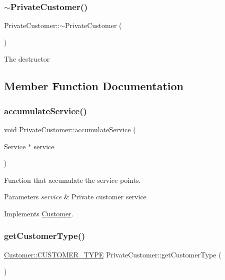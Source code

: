 \subsubsection{\texorpdfstring{$\sim$\+Private\+Customer()}{~PrivateCustomer()}}
{\footnotesize\ttfamily Private\+Customer\+::$\sim$\+Private\+Customer (\begin{DoxyParamCaption}{ }\end{DoxyParamCaption})}

The destructor 

\subsection{Member Function Documentation}
\hypertarget{classPrivateCustomer_a22e7d589398c26ac37973660f6e6f338}{}\label{classPrivateCustomer_a22e7d589398c26ac37973660f6e6f338} 
\subsubsection{\texorpdfstring{accumulate\+Service()}{accumulateService()}}
{\footnotesize\ttfamily void Private\+Customer\+::accumulate\+Service (\begin{DoxyParamCaption}\item[{\hyperlink{classService}{Service} $\ast$}]{service }\end{DoxyParamCaption})\hspace{0.3cm}{\ttfamily [virtual]}}

Function that accumulate the service points. 
\begin{DoxyParams}{Parameters}
{\em service} & Private customer service \\
\hline
\end{DoxyParams}


Implements \hyperlink{classCustomer_ab42320f3e4d1c23e745ce901d30faf77}{Customer}.

\hypertarget{classPrivateCustomer_a07d4d3e5995758b2407b8a81e35e579a}{}\label{classPrivateCustomer_a07d4d3e5995758b2407b8a81e35e579a} 
\subsubsection{\texorpdfstring{get\+Customer\+Type()}{getCustomerType()}}
{\footnotesize\ttfamily \hyperlink{classCustomer_adf157cb713398bb38163743659ec3049}{Customer\+::\+C\+U\+S\+T\+O\+M\+E\+R\+\_\+\+T\+Y\+PE} Private\+Customer\+::get\+Customer\+Type (\begin{DoxyParamCaption}{ }\end{DoxyParamCaption})\hspace{0.3cm}{\ttfamily [virtual]}}

